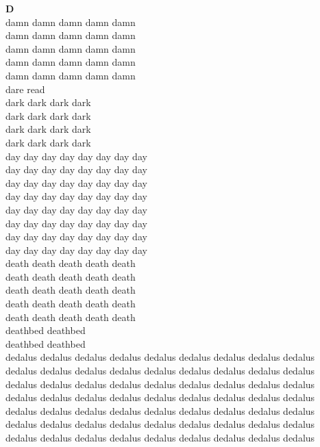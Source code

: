 \vspace{14pt}
\noindent\textbf{\Large D}\\[+12pt]
damn damn damn damn damn\\
damn damn damn damn damn\\
damn damn damn damn damn\\
damn damn damn damn damn\\
damn damn damn damn damn\\
dare read\\
dark dark dark dark\\
dark dark dark dark\\
dark dark dark dark\\
dark dark dark dark\\
day day day day day day day day\\
day day day day day day day day\\
day day day day day day day day\\
day day day day day day day day\\
day day day day day day day day\\
day day day day day day day day\\
day day day day day day day day\\
day day day day day day day day\\
death death death death death\\
death death death death death\\
death death death death death\\
death death death death death\\
death death death death death\\
deathbed deathbed\\
deathbed deathbed\\
dedalus dedalus dedalus dedalus dedalus dedalus dedalus dedalus dedalus\\
dedalus dedalus dedalus dedalus dedalus dedalus dedalus dedalus dedalus\\
dedalus dedalus dedalus dedalus dedalus dedalus dedalus dedalus dedalus\\
dedalus dedalus dedalus dedalus dedalus dedalus dedalus dedalus dedalus\\
dedalus dedalus dedalus dedalus dedalus dedalus dedalus dedalus dedalus\\
dedalus dedalus dedalus dedalus dedalus dedalus dedalus dedalus dedalus\\
dedalus dedalus dedalus dedalus dedalus dedalus dedalus dedalus dedalus\\
